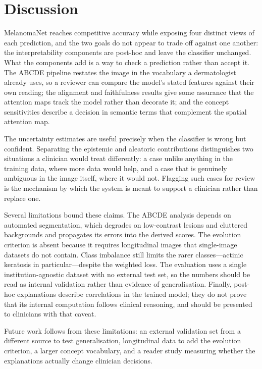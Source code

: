 \section{Discussion}

MelanomaNet reaches competitive accuracy while exposing four distinct views of
each prediction, and the two goals do not appear to trade off against one
another: the interpretability components are post-hoc and leave the classifier
unchanged. What the components add is a way to check a prediction rather than
accept it. The ABCDE pipeline restates the image in the vocabulary a
dermatologist already uses, so a reviewer can compare the model's stated
features against their own reading; the alignment and faithfulness results give
some assurance that the attention maps track the model rather than decorate it;
and the concept sensitivities describe a decision in semantic terms that
complement the spatial attention map.

The uncertainty estimates are useful precisely when the classifier is wrong but
confident. Separating the epistemic and aleatoric contributions distinguishes
two situations a clinician would treat differently: a case unlike anything in
the training data, where more data would help, and a case that is genuinely
ambiguous in the image itself, where it would not. Flagging such cases for
review is the mechanism by which the system is meant to support a clinician
rather than replace one.

Several limitations bound these claims. The ABCDE analysis depends on automated
segmentation, which degrades on low-contrast lesions and cluttered backgrounds
and propagates its errors into the derived scores. The evolution criterion is
absent because it requires longitudinal images that single-image datasets do
not contain. Class imbalance still limits the rarer classes---actinic keratosis
in particular---despite the weighted loss. The evaluation uses a single
institution-agnostic dataset with no external test set, so the numbers should be
read as internal validation rather than evidence of generalisation. Finally,
post-hoc explanations describe correlations in the trained model; they do not
prove that its internal computation follows clinical reasoning, and should be
presented to clinicians with that caveat.

Future work follows from these limitations: an external validation set from a
different source to test generalisation, longitudinal data to add the evolution
criterion, a larger concept vocabulary, and a reader study measuring whether the
explanations actually change clinician decisions.
